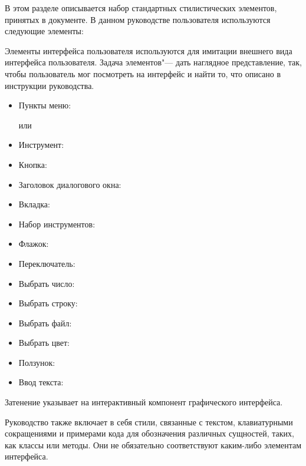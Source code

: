 \label{label_conventions}

В этом разделе описывается набор стандартных стилистических элементов,
принятых в документе. В данном руководстве пользователя
используются следующие элементы:


Элементы интерфейса пользователя используются для имитации внешнего
вида интерфейса пользователя. Задача элементов"--- дать наглядное
представление, так, чтобы пользователь мог посмотреть на интерфейс и
найти то, что описано в инструкции руководства.

\begin{itemize}[label=--,itemsep=5pt]
\item Пункты меню:  \arrow
{}

или

 \arrow
{} \arrow {}
\item Инструмент: 
\item Кнопка: 
\item Заголовок диалогового окна: 
\item Вкладка: 
\item Набор инструментов: 
\item Флажок: 
\item Переключатель:  
\item Выбрать число: 
\item Выбрать строку: 
\item Выбрать файл: \browsebutton
\item Выбрать цвет: 
\item Ползунок: 
\item Ввод текста: 
\end{itemize}
Затенение указывает на интерактивный компонент графического интерфейса.


Руководство также включает в себя стили, связанные с текстом,
клавиатурными сокращениями и примерами кода для обозначения различных
сущностей, таких, как классы или методы. Они не обязательно соответствуют
каким-либо элементам интерфейса.

